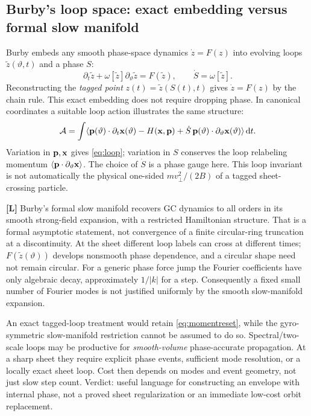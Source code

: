 \documentclass[10pt,a4paper]{article}
\newcommand{\avg}[1]{\langle #1\rangle}
\newcommand{\lit}{\textbf{[L]}}
\begin{document}
\subsection{Burby's loop space: exact embedding versus formal slow manifold}
Burby \cite{burby} embeds any smooth phase-space dynamics $\dot z=F(z)$ into evolving loops $\widetilde z(\vartheta,t)$ and a phase $S$:
\begin{equation}\label{eq:loop}
 \partial_t\widetilde z+\omega[\widetilde z]\partial_\vartheta\widetilde z
 =F(\widetilde z),\qquad \dot S=\omega[\widetilde z].
\end{equation}
Reconstructing the \emph{tagged point} $z(t)=\widetilde z(S(t),t)$ gives $\dot z=F(z)$ by the chain rule. This exact embedding does not require dropping phase. In canonical coordinates a suitable loop action illustrates the same structure:
\begin{equation}\label{eq:loopaction}
 \mathcal A=\int\avg{\p(\vartheta)\cdot\partial_t\x(\vartheta)
 -H(\x,\p)+\dot S\,\p(\vartheta)\cdot\partial_\vartheta\x(\vartheta)}\,\dd t.
\end{equation}
Variation in $\mathbf p,\mathbf x$ gives \eqref{eq:loop}; variation in $S$ conserves the loop relabeling momentum $\avg{\p\cdot\partial_\vartheta\x}$. The choice of $\dot S$ is a phase gauge here. This loop invariant is not automatically the physical one-sided $m v_\perp^2/(2B)$ of a tagged sheet-crossing particle.

\lit{} Burby's formal slow manifold recovers GC dynamics to all orders in its smooth strong-field expansion, with a restricted Hamiltonian structure. That is a formal asymptotic statement, not convergence of a finite circular-ring truncation at a discontinuity. At the sheet different loop labels can cross at different times; $F(\widetilde z(\vartheta))$ develops nonsmooth phase dependence, and a circular shape need not remain circular. For a generic phase force jump the Fourier coefficients have only algebraic decay, approximately $1/|k|$ for a step. Consequently a fixed small number of Fourier modes is not justified uniformly by the smooth slow-manifold expansion.

An exact tagged-loop treatment would retain \eqref{eq:momentreset}, while the gyro-symmetric slow-manifold restriction cannot be assumed to do so. Spectral/two-scale loops may be productive for \emph{smooth-volume} phase-accurate propagation. At a sharp sheet they require explicit phase events, sufficient mode resolution, or a locally exact sheet loop. Cost then depends on modes and event geometry, not just slow step count. Verdict: useful language for constructing an envelope with internal phase, not a proved sheet regularization or an immediate low-cost orbit replacement.
\end{document}
